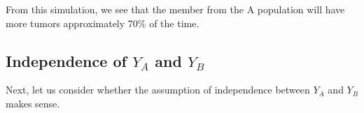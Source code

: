 \documentclass[12pt]{article}
\begin{document}
From this simulation, we see that the member from the A population will have more tumors approximately 70\% of the time.

\subsection{Independence of $Y_A$ and $Y_B$}

Next, let us consider whether the assumption of independence between $Y_A$ and $Y_B$ makes sense.




\end{document}
